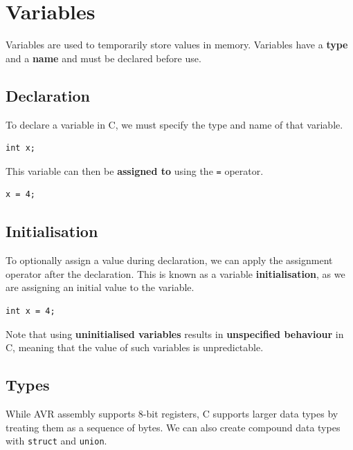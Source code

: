 \documentclass{report}
\begin{document}
\chapter{Variables}
Variables are used to temporarily store values in memory.
Variables have a \textbf{type} and a \textbf{name} and must be declared before use.
\section{Declaration}
To declare a variable in C, we must specify the type and name of that variable.
\begin{verbatim}
int x;
\end{verbatim}
This variable can then be \textbf{assigned to} using the \texttt{=} operator.
\begin{verbatim}
x = 4;
\end{verbatim}
\section{Initialisation}
To optionally assign a value during declaration, we can apply the assignment operator after
the declaration. This is known as a variable \textbf{initialisation}, as we are assigning an initial value to the variable.
\begin{verbatim}
int x = 4;
\end{verbatim}
Note that using \textbf{uninitialised variables} results in \textbf{unspecified behaviour} in C, meaning that
the value of such variables is unpredictable.
\section{Types}
While AVR assembly supports 8-bit registers, C supports larger data types by treating them as a sequence of bytes.
We can also create compound data types with \texttt{struct} and \texttt{union}.
\end{document}
